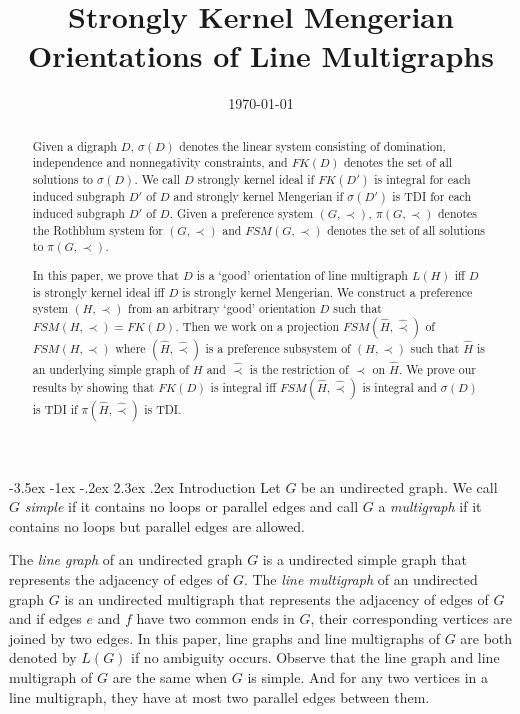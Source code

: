 \documentclass[11pt]{article}
\title{{\Large\bf  Strongly Kernel Mengerian Orientations of Line Multigraphs}}
\author{}
\makeatletter
\numberwithin{theorem}{section}
\renewcommand\section{%
  \@startsection{section}{1}
                {\z@}%
                {-3.5ex \@plus -1ex \@minus -.2ex}%
                {2.3ex \@plus.2ex}%
                {\large\bfseries}%
}
\makeatother
\begin{document}
\date{\today}


\maketitle

\jot

\begin{abstract}
Given a digraph $D$, $\sigma(D)$ denotes the linear system consisting of domination, independence and nonnegativity constraints, and $FK(D)$ denotes the set of all solutions to $\sigma(D)$. We call $D$ strongly kernel ideal if $FK(D')$ is integral for each induced subgraph $D'$ of $D$ and strongly kernel Mengerian if $\sigma(D')$ is TDI for each induced subgraph $D'$ of $D$. Given a preference system $(G,\prec)$, $\pi(G,\prec)$ denotes the Rothblum system for $(G,\prec)$ and $FSM(G,\prec)$ denotes the set of all solutions to $\pi(G,\prec)$. 

In this paper, we prove that  $D$ is a `good' orientation of line multigraph $L(H)$ iff $D$ is strongly kernel ideal iff $D$ is strongly kernel Mengerian. We construct a preference system $(H,\prec)$ from an arbitrary `good' orientation $D$ such that $FSM(H,\prec)=FK(D)$. Then we work on a projection $FSM(\hat{H},\hat\prec)$ of $FSM(H,\prec)$ where $(\hat{H},\hat\prec)$ is a preference subsystem of $(H,\prec)$ such that $\hat{H}$ is an underlying simple graph of $H$ and $\hat\prec$ is the restriction of $\prec$ on $\hat{H}$. We prove our results by showing that $FK(D)$ is integral iff $FSM(\hat{H},\hat\prec)$ is integral and $\sigma(D)$ is TDI if $\pi(\hat{H},\hat\prec)$ is TDI.
\end{abstract}

\section{Introduction}
\label{intro}
Let $G$ be an undirected graph. We call $G$ \textit{simple} if it contains no loops or parallel edges and call $G$ a \textit{multigraph} if it contains no loops but parallel edges are allowed. 

The \textit{line graph} of an undirected graph $G$ is a undirected simple graph that represents the adjacency of edges of $G$. The \textit{line multigraph} of an undirected graph $G$ is an undirected multigraph that represents the adjacency of edges of $G$ and if edges $e$ and $f$ have two common ends in $G$, their corresponding vertices are joined by two edges. In this paper, line graphs and line multigraphs of $G$ are both denoted by $L(G)$ if no ambiguity occurs. Observe that the line graph and line multigraph of $G$ are the same when $G$ is simple. And for any two vertices in a line multigraph, they have at most two parallel edges between them.
\end{document}
